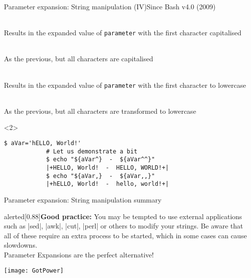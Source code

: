 \begin{frame}[fragile]{Parameter expansion: String manipulation (IV)}{Since Bash v4.0 (2009)}
    \vspace{-3mm}
    \begin{description}
        \item[First uppercase:] \\
            {\small
                Results in the expanded value of \texttt{parameter} with the first character capitalised
            }
        \item[All uppercase:] \\
            {\small
                As the previous, but all characters are capitalised
            }
        \item[First uppercase:] \\
            {\small
                Results in the expanded value of \texttt{parameter} with the first character to lowercase
            }
        \item[All lowercase:] \\
            {\small
                As the previous, but all characters are transformed to lowercase
            }
    \end{description}
    \begin{uncoverenv}<2>
        \begin{lstlisting}[style=MyBash, style=oddnumbers, aboveskip=2mm]
            $ aVar='hELLO, World!'
            # Let us demonstrate a bit
            $ echo "${aVar^}  -  ${aVar^^}"
            |+HELLO, World!  -  HELLO, WORLD!+|
            $ echo "${aVar,}  -  ${aVar,,}"
            |+hELLO, World!  -  hello, world!+|
        \end{lstlisting}
    \end{uncoverenv}
\end{frame}
\begin{frame}{Parameter expansion: String manipulation summary}
    \vspace{-3mm}
    \begin{varblock}{alerted}[0.88\textwidth]{\textbf{Good practice:}}
        You may be tempted to use external applications such as \bash|sed|, \bash|awk|, \bash|cut|, \bash|perl| or others to modify your strings.
        Be aware that all of these require an extra process to be started, which in some cases can cause slowdowns.\\
        \alert{Parameter Expansions are the perfect alternative!}
    \end{varblock}
    \bigskip
    \centerline{\texttt{[image: GotPower]}}
\end{frame}

